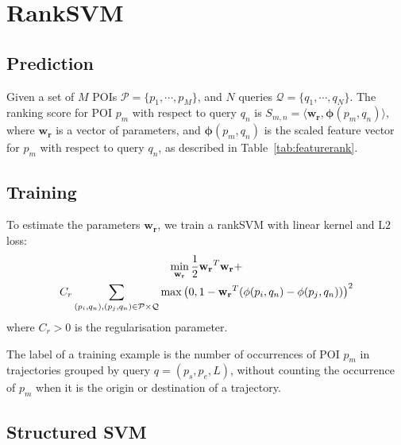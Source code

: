 {%





\section{RankSVM}
\label{appendix:ranksvm}

\subsection{Prediction}
Given a set of $M$ POIs $\mathcal{P} = \{p_1, \cdots, p_M\}$,
and $N$ queries $\mathcal{Q} = \{q_1, \cdots, q_N\}$.
The ranking score for POI $p_m$ with respect to query $q_n$ is
$S_{m,n} = \langle \mathbf{w_r}, \mathbf{\phi}(p_m, q_n) \rangle$,
where $\mathbf{w_r}$ is a vector of parameters,
and $\mathbf{\phi}(p_m, q_n)$ is the scaled feature vector for $p_m$ with respect to query $q_n$,
as described in Table~\ref{tab:featurerank}.

\subsection{Training}
To estimate the parameters $\mathbf{w_r}$, we train a rankSVM with linear kernel and L$2$ loss:
\begin{multline}
\min_{\mathbf{w_r}} \frac{1}{2} \mathbf{w_r}^T \mathbf{w_r} + \\ \hfill
                    C_r \sum_{(p_i, q_n), (p_j, q_n) \in \mathcal{P} \times \mathcal{Q}}
                    \max \left( 0, 1 - \mathbf{w_r}^T (\mathbf{\phi}(p_i, q_n) - \mathbf{\phi}(p_j, q_n)) \right)^2
\end{multline}
where $C_r > 0$ is the regularisation parameter.

The label of a training example is the number of occurrences of POI $p_m$ in trajectories grouped by query $q = (p_s, p_e, L)$,
without counting the occurrence of $p_m$ when it is the origin or destination of a trajectory.


\subsection{Structured SVM}
\label{sec:ssvm}
\secmoveup

}
